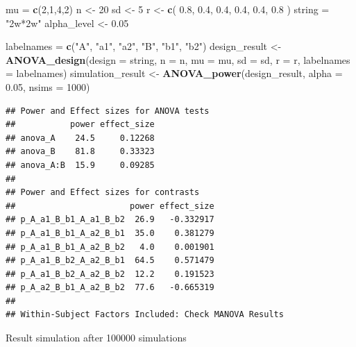 \documentclass[]{book}
\newenvironment{Shaded}{\begin{snugshade}}{\end{snugshade}}
\newcommand{\DataTypeTok}[1]{\textcolor[rgb]{0.13,0.29,0.53}{#1}}
\newcommand{\DecValTok}[1]{\textcolor[rgb]{0.00,0.00,0.81}{#1}}
\newcommand{\FloatTok}[1]{\textcolor[rgb]{0.00,0.00,0.81}{#1}}
\newcommand{\KeywordTok}[1]{\textcolor[rgb]{0.13,0.29,0.53}{\textbf{#1}}}
\newcommand{\NormalTok}[1]{#1}
\newcommand{\StringTok}[1]{\textcolor[rgb]{0.31,0.60,0.02}{#1}}
\begin{document}
\begin{Shaded}
\begin{Highlighting}[]
\NormalTok{mu =}\StringTok{ }\KeywordTok{c}\NormalTok{(}\DecValTok{2}\NormalTok{,}\DecValTok{1}\NormalTok{,}\DecValTok{4}\NormalTok{,}\DecValTok{2}\NormalTok{) }
\NormalTok{n <-}\StringTok{ }\DecValTok{20}
\NormalTok{sd <-}\StringTok{ }\DecValTok{5}
\NormalTok{r <-}\StringTok{ }\KeywordTok{c}\NormalTok{(}
  \FloatTok{0.8}\NormalTok{, }\FloatTok{0.4}\NormalTok{, }\FloatTok{0.4}\NormalTok{,}
       \FloatTok{0.4}\NormalTok{, }\FloatTok{0.4}\NormalTok{,}
            \FloatTok{0.8}
\NormalTok{  )}
\NormalTok{string =}\StringTok{ "2w*2w"}
\NormalTok{alpha_level <-}\StringTok{ }\FloatTok{0.05}

\NormalTok{labelnames =}\StringTok{ }\KeywordTok{c}\NormalTok{(}\StringTok{"A"}\NormalTok{, }\StringTok{"a1"}\NormalTok{, }\StringTok{"a2"}\NormalTok{, }\StringTok{"B"}\NormalTok{, }\StringTok{"b1"}\NormalTok{, }\StringTok{"b2"}\NormalTok{)}
\NormalTok{design_result <-}\StringTok{ }\KeywordTok{ANOVA_design}\NormalTok{(}\DataTypeTok{design =}\NormalTok{ string,}
                              \DataTypeTok{n =}\NormalTok{ n, }
                              \DataTypeTok{mu =}\NormalTok{ mu, }
                              \DataTypeTok{sd =}\NormalTok{ sd, }
                              \DataTypeTok{r =}\NormalTok{ r, }
                              \DataTypeTok{labelnames =}\NormalTok{ labelnames)}
\NormalTok{simulation_result <-}\StringTok{ }\KeywordTok{ANOVA_power}\NormalTok{(design_result, }\DataTypeTok{alpha =} \FloatTok{0.05}\NormalTok{, }\DataTypeTok{nsims =} \DecValTok{1000}\NormalTok{)}
\end{Highlighting}
\end{Shaded}

\begin{verbatim}
## Power and Effect sizes for ANOVA tests
##           power effect_size
## anova_A    24.5     0.12268
## anova_B    81.8     0.33323
## anova_A:B  15.9     0.09285
## 
## Power and Effect sizes for contrasts
##                       power effect_size
## p_A_a1_B_b1_A_a1_B_b2  26.9   -0.332917
## p_A_a1_B_b1_A_a2_B_b1  35.0    0.381279
## p_A_a1_B_b1_A_a2_B_b2   4.0    0.001901
## p_A_a1_B_b2_A_a2_B_b1  64.5    0.571479
## p_A_a1_B_b2_A_a2_B_b2  12.2    0.191523
## p_A_a2_B_b1_A_a2_B_b2  77.6   -0.665319
## 
## Within-Subject Factors Included: Check MANOVA Results
\end{verbatim}

Result simulation after 100000 simulations
\end{document}
